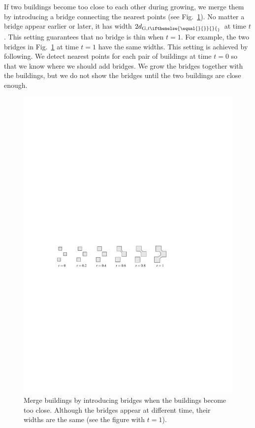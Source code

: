 \documentclass[graybox]{svmult}
\newcommand{\fig}{Fig.~}
\newcommand{\dtrm}[2][]{d_{\mathrm{#2}, t\ifthenelse{\equal{#1}{}}{}{_#1}}}
\begin{document}
If two buildings become too close to each other during growing, 
we merge them by introducing a bridge connecting the nearest points 
(see \fig\ref{fig:GrowAndBridge}).
No matter a bridge appear earlier or later, 
it has width $2\dtrm{G}$ at time $t$.
This setting guarantees that no bridge is thin when $t=1$.
For example, the two bridges in \fig\ref{fig:GrowAndBridge} at time $t=1$ have 
the same widths.
This setting is achieved by following.
We detect nearest points for each pair of buildings at time $t=0$ so that 
we know where we should add bridges. 
We grow the bridges together with the buildings,
but we do not show the bridges until the two buildings are close enough. 


\begin{figure}[tb]
	\centering
	\includegraphics{GrowAndBridge}
	\caption{Merge buildings by introducing bridges when the buildings become 
	too close.
		Although the bridges appear at different time, 
		their widths are the same (see the figure with $t=1$).}
	\label{fig:GrowAndBridge}
\end{figure}
\end{document}
